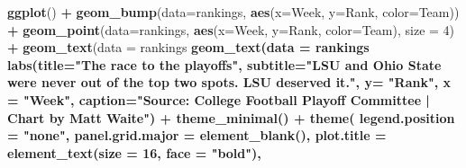 \documentclass[]{book}
\newenvironment{Shaded}{\begin{snugshade}}{\end{snugshade}}
\newcommand{\DataTypeTok}[1]{\textcolor[rgb]{0.13,0.29,0.53}{#1}}
\newcommand{\DecValTok}[1]{\textcolor[rgb]{0.00,0.00,0.81}{#1}}
\newcommand{\FloatTok}[1]{\textcolor[rgb]{0.00,0.00,0.81}{#1}}
\newcommand{\KeywordTok}[1]{\textcolor[rgb]{0.13,0.29,0.53}{\textbf{#1}}}
\newcommand{\NormalTok}[1]{#1}
\newcommand{\OperatorTok}[1]{\textcolor[rgb]{0.81,0.36,0.00}{\textbf{#1}}}
\newcommand{\StringTok}[1]{\textcolor[rgb]{0.31,0.60,0.02}{#1}}
\begin{document}
\begin{Shaded}
\begin{Highlighting}[]
\KeywordTok{ggplot}\NormalTok{() }\OperatorTok{+}\StringTok{ }
\StringTok{  }\KeywordTok{geom_bump}\NormalTok{(}\DataTypeTok{data=}\NormalTok{rankings, }\KeywordTok{aes}\NormalTok{(}\DataTypeTok{x=}\NormalTok{Week, }\DataTypeTok{y=}\NormalTok{Rank, }\DataTypeTok{color=}\NormalTok{Team)) }\OperatorTok{+}\StringTok{ }
\StringTok{  }\KeywordTok{geom_point}\NormalTok{(}\DataTypeTok{data=}\NormalTok{rankings, }\KeywordTok{aes}\NormalTok{(}\DataTypeTok{x=}\NormalTok{Week, }\DataTypeTok{y=}\NormalTok{Rank, }\DataTypeTok{color=}\NormalTok{Team), }\DataTypeTok{size =} \DecValTok{4}\NormalTok{) }\OperatorTok{+}\StringTok{   }
\StringTok{  }\KeywordTok{geom_text}\NormalTok{(}\DataTypeTok{data =}\NormalTok{ rankings }\OperatorTok{%
\StringTok{  }\KeywordTok{geom_text}\NormalTok{(}\DataTypeTok{data =}\NormalTok{ rankings }\OperatorTok{%
\StringTok{  }\KeywordTok{labs}\NormalTok{(}\DataTypeTok{title=}\StringTok{"The race to the playoffs"}\NormalTok{, }\DataTypeTok{subtitle=}\StringTok{"LSU and Ohio State were never out of the top two spots. LSU deserved it."}\NormalTok{, }\DataTypeTok{y=} \StringTok{"Rank"}\NormalTok{, }\DataTypeTok{x =} \StringTok{"Week"}\NormalTok{, }\DataTypeTok{caption=}\StringTok{"Source: College Football Playoff Committee | Chart by Matt Waite"}\NormalTok{) }\OperatorTok{+}
\StringTok{  }\KeywordTok{theme_minimal}\NormalTok{() }\OperatorTok{+}
\StringTok{  }\KeywordTok{theme}\NormalTok{(}
    \DataTypeTok{legend.position =} \StringTok{"none"}\NormalTok{,}
    \DataTypeTok{panel.grid.major =} \KeywordTok{element_blank}\NormalTok{(),}
    \DataTypeTok{plot.title =} \KeywordTok{element_text}\NormalTok{(}\DataTypeTok{size =} \DecValTok{16}\NormalTok{, }\DataTypeTok{face =} \StringTok{"bold"}\NormalTok{),}
}}
\end{Highlighting}
\end{Shaded}
\end{document}
